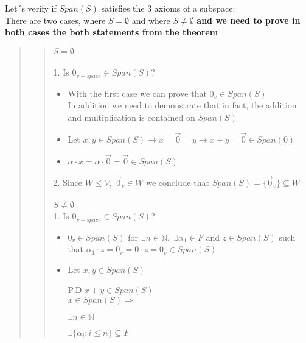 \documentclass{article}
\begin{document}
Let´s verify if \(Span(S)\) satisfies the 3 axioms of a subspace:
\\

There are two cases, where \(S = \emptyset\) and where \(S \neq \emptyset\) \textbf{and we need to prove in both cases the both statements from the theorem}


\begin{quote}

\begin{quote}
\(S = \emptyset\)
\\\\
1. Is \(0_{v-space} \in Span(S)\)?

\begin{itemize}
    \item With the first case we can prove that \(0_v \in Span(S)\)
    \\
    
    In addition we need to demonstrate that in fact, the addition and multiplication is contained on \(Span(S)\)

    \item Let \(x, y \in Span(S) \rightarrow x= \vec{0} =y \rightarrow x+y= \vec{0} \in Span(0)\)

    \item \(\alpha \cdot x = \alpha \cdot \vec{0} = \vec{0} \in Span(S)\)
    \end{itemize}
    
    2. Since \(W \leq V,\; \vec{0}_v \in W\) we conclude that \(Span(S) = \{\vec{0}_v\} \subseteq W\)
\\
\\
\(S \neq \emptyset\)
\\

1. Is \(0_{v-space} \in Span(S)\)?

\begin{itemize}
    \item \(0_v \in Span(S)\) for \(\exists n \in \mathbb{N},\;\exists \alpha_1 \in F\) and \(z \in Span(S)\) such that \(\alpha_1 \cdot z = 0_v = 0 \cdot z = 0_v \in Span(S)\)

    \item Let \(x,y \in Span(S)\)

    P.D \(x+y \in Span(S)\)
    \\

    \(x \in Span(S) \Rightarrow\)

    \(\exists n \in \mathbb{N}\)

    \(\exists \{\alpha_i : i \leq n\} \subseteq F\)


\end{itemize}
\end{quote}
\end{quote}
\end{document}
